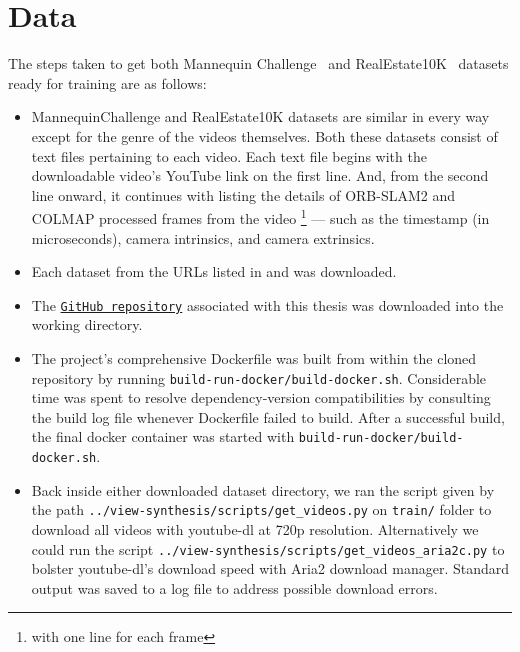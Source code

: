 \section{Data}\label{sec:data} 

The steps taken to get both Mannequin Challenge~\cite{li2019learning} and RealEstate10K~\cite{zhou2018stereo} datasets ready for training are as follows:

\begin{itemize}

    \item MannequinChallenge and RealEstate10K datasets are similar in every way except for the genre of the videos themselves. Both these datasets consist of text files pertaining to each video. Each text file begins with the downloadable video’s YouTube link on the first line. And, from the second line onward, it continues with listing the details of ORB-SLAM2 and COLMAP processed frames from the video \footnote{with one line for each frame} --- such as the timestamp (in microseconds), camera intrinsics, and camera extrinsics.
    
    \item Each dataset from the URLs listed in \cite{zhou2018stereo} and \cite{li2019learning} was downloaded. 
    
    \item The \href{https://github.com/au001/view-synthesis.git}{\texttt{GitHub repository}} associated with this thesis was downloaded into the working directory.

    \item The project's comprehensive Dockerfile was built from within the cloned repository by running \texttt{build-run-docker/build-docker.sh}. Considerable time was spent to resolve dependency-version compatibilities by consulting the build log file whenever Dockerfile failed to build. After a successful build, the final docker container was started with \texttt{build-run-docker/build-docker.sh}.
    
    \item Back inside either downloaded dataset directory, we ran the script given by the path \texttt{../view-synthesis/scripts/get\_videos.py} on \texttt{train/} folder to download all videos with youtube-dl at 720p resolution. Alternatively we could run the script \texttt{../view-synthesis/scripts/get\_videos\_aria2c.py} to bolster youtube-dl’s download speed with Aria2 download manager. Standard output was saved to a log file to address possible download errors. 
    

\end{itemize}
